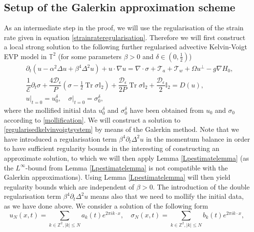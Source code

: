 \documentclass[12pt,a4paper]{article}
\theoremstyle{definition}
\theoremstyle{remark}
\numberwithin{equation}{section}
\DeclareMathOperator{\Tr}{Tr}
\begin{document}
\subsection{Setup of the Galerkin approximation scheme}
As an intermediate step in the proof, we will use the regularisation of the strain rate given in equation \eqref{strainrateregularisation}. Therefore we will first construct a local strong solution to the following further regularised advective Kelvin-Voigt EVP model in $\mathbb{T}^2$ (for some parameters $\beta > 0$ and $\delta \in \left(0, \frac{1}{2}\right)$)
\begin{subequations} \label{regularisedkelvinvoigtsystem}
\begin{align}
	&\partial_t (u - \alpha^2 \Delta u + \beta^4 \Delta^2 u) + u \cdot \nabla u = \nabla \cdot \sigma + \mathcal{T}_a + \mathcal{T}_w + \Omega u^\perp - g \nabla H_0, \label{regularisedkelvinvoigt1} \\
	&\dfrac{1}{\mathcal E} \partial_t \sigma + \dfrac{4 \mathcal{D}_\epsilon}{P} (\sigma - \frac{1}{2} \Tr \sigma \mathbb I_2) + \dfrac{\mathcal{D}_\epsilon}{2P} \Tr \sigma \mathbb I_2 + \dfrac{\mathcal{D}_\epsilon}{2} \mathbb I_2  = D(u), \label{regularisedkelvinvoigt2}
	\\
	&u \lvert_{t = 0} = u_0^\delta, \quad \sigma \lvert_{t = 0} = \sigma_0^\delta, \label{regularisedkelvinvoigt3}
\end{align}
\end{subequations}
where the mollified initial data $u_0^\delta$ and $\sigma_0^\delta$ have been obtained from $u_0$ and $\sigma_0$ according to \eqref{mollification}. We will construct a solution to \eqref{regularisedkelvinvoigtsystem} by means of the Galerkin method. Note that we have introduced a regularisation term $\beta^4 \partial_t \Delta^2 u$ in the momentum balance in order to have sufficient regularity bounds in the interesting of constructing an approximate solution, to which we will then apply Lemma \ref{Lpestimatelemma} (as the $L^\infty$-bound from Lemma \ref{Lpestimatelemma} is not compatible with the Galerkin approximations). Using Lemma \ref{Lpestimatelemma} will then yield regularity bounds which are independent of $\beta > 0$. The introduction of the double regularisation term $\beta^4 \partial_t \Delta^2 u$ means also that we need to mollify the initial data, as we have done above. We consider a solution of the following form
\begin{equation*}
	u_N(x,t) = \sum_{k \in \mathbb{Z}^2, \lvert k \rvert \leq N} a_k (t) e^{2 \pi i k \cdot x}, \quad \sigma_N(x,t) = \sum_{k \in \mathbb{Z}^2, \lvert k \rvert \leq N} b_k(t) e^{2 \pi i k \cdot x},
\end{equation*}
\end{document}
